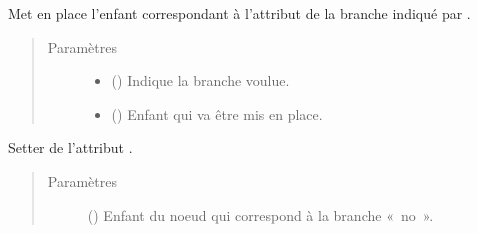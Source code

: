 \documentclass[letterpaper,10pt,french]{sphinxmanual}
\begin{document}
\begin{fulllineitems}
\begin{fulllineitems}
\label{\detokenize{index:StrategyTree.Observation.set_child_by_attribute}}
Met en place l’enfant correspondant à l’attribut de la branche indiqué
par .
\begin{quote}\begin{description}
\item[{Paramètres}] \leavevmode\begin{itemize}
\item {} 
 () \textendash{} Indique la branche voulue.

\item {} 
 ({\hyperref[\detokenize{index:StrategyTree.NodeST}]{}}\sphinxstyleliteralemphasis{\sphinxupquote{, }}) \textendash{} Enfant qui va être mis en place.

\end{itemize}

\end{description}\end{quote}

\end{fulllineitems}


\begin{fulllineitems}
\label{\detokenize{index:StrategyTree.Observation.set_no_child}}
Setter de l’attribut .
\begin{quote}\begin{description}
\item[{Paramètres}] \leavevmode
{} ({\hyperref[\detokenize{index:StrategyTree.NodeST}]{}}\sphinxstyleliteralemphasis{\sphinxupquote{, }}) \textendash{} Enfant du noeud qui correspond à la branche « no ».


\end{description}
\end{quote}
\end{fulllineitems}
\end{fulllineitems}
\end{document}
